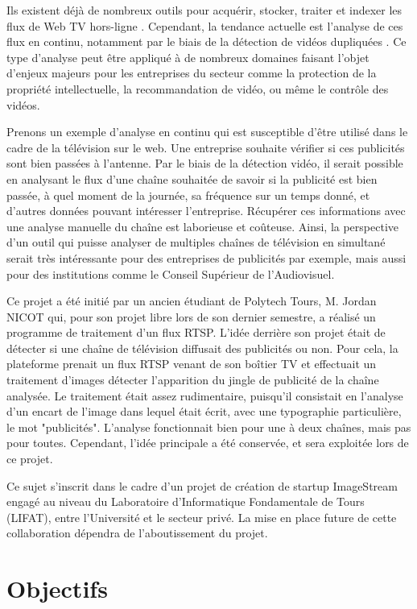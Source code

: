 \documentclass{polytech/polytech}
\begin{document}
Ils existent déjà de nombreux outils pour acquérir, stocker, traiter et indexer les flux de Web TV hors-ligne \cite{abduraman_tv_2012}. Cependant, la tendance actuelle est l’analyse de ces flux en continu, notamment par le biais de la détection de vidéos dupliquées \cite{liu_near-duplicate_2013}. Ce type d’analyse peut être appliqué à de nombreux domaines faisant l’objet d’enjeux majeurs pour les entreprises du secteur comme la protection de la propriété intellectuelle, la recommandation de vidéo, ou même le contrôle des vidéos.

Prenons un exemple d’analyse en continu qui est susceptible d’être utilisé dans le cadre de la télévision sur le web. Une entreprise souhaite vérifier si ces publicités sont bien passées à l’antenne. Par le biais de la détection vidéo, il serait possible en analysant le flux d’une chaîne souhaitée de savoir si la publicité est bien passée, à quel moment de la journée, sa fréquence sur un temps donné, et d’autres données pouvant intéresser l’entreprise. Récupérer ces informations avec une analyse manuelle du chaîne est laborieuse et coûteuse. Ainsi, la perspective d'un outil qui puisse analyser de multiples chaînes de télévision en simultané serait très intéressante pour des entreprises de publicités par exemple, mais aussi pour des institutions comme le Conseil Supérieur de l'Audiovisuel.

Ce projet a été initié par un ancien étudiant de Polytech Tours, M. Jordan NICOT qui, pour son projet libre lors de son dernier semestre, a réalisé un programme de traitement d’un flux RTSP. L’idée derrière son projet était de détecter si une chaîne de télévision diffusait des publicités ou non. Pour cela, la plateforme prenait un flux RTSP venant de son boîtier TV et effectuait un traitement d’images détecter l’apparition du jingle de publicité de la chaîne analysée. Le traitement était assez rudimentaire, puisqu’il consistait en l’analyse d’un encart de l’image dans lequel était écrit, avec une typographie particulière, le mot "publicités". L’analyse fonctionnait bien pour une à deux chaînes, mais pas pour toutes. Cependant, l’idée principale a été conservée, et sera exploitée lors de ce projet.

Ce sujet s’inscrit dans le cadre d’un projet de création de startup ImageStream engagé au niveau du Laboratoire d’Informatique Fondamentale de Tours (LIFAT), entre l’Université et le secteur privé. La mise en place future de cette collaboration dépendra de l'aboutissement du projet. 

\section{Objectifs}
\end{document}
